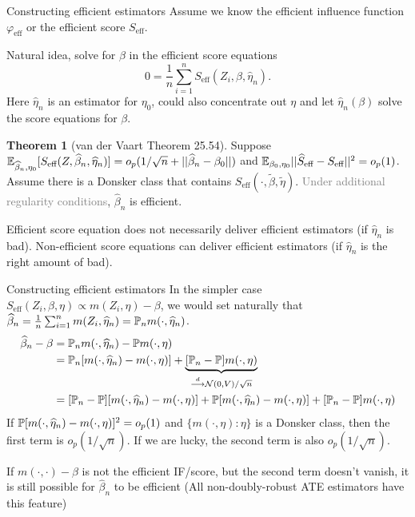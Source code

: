 \documentclass[10pt,aspectratio=169,handout]{beamer}
\theoremstyle{definition}
\newtheorem{thm}{Theorem}
\newcommand{\light}[1]{\textcolor{gray}{#1}}
\begin{document}
\begin{frame}{Constructing efficient estimators}
\small
Assume we know the efficient influence function $\varphi_{\text{eff}}$ or
the efficient score $S_{\text{eff}}$. 

Natural idea, solve for $\beta$ in
the \alert{efficient score equations} \[
0 = \frac{1}{n}\sum_{i=1}^n S_{\text{eff}}(Z_i,
\beta, \hat \eta_n).
\]
Here $\hat \eta_n$ is an estimator for $\eta_0$, could also concentrate out
$\eta$ and let $\hat \eta_n(\beta)$ solve the score equations for $\beta$. 
\begin{thm}[van der Vaart Theorem 25.54]
  Suppose $\E_{\hat\beta_n,\eta_0}[S_\text{eff}(Z, \hat\beta_n,
  \hat\eta_n)] = o_p(1/\sqrt{n} + ||\hat \beta_n - \beta_0||)$ and $\E_
  {\beta_0, \eta_0}||\hat S_\text{eff} - S_\text{eff}||^2 = o_p(1)$. Assume
there is a Donsker class that contains $S_{\text{eff}}(\cdot,
\tilde \beta, \tilde \eta)$. \light{Under additional regularity
conditions},
  $\hat\beta_n$ is efficient.
\end{thm}

\begin{rmk}
  Efficient score equation does not necessarily deliver efficient
  estimators (if $\hat\eta_n$ is bad). Non-efficient score equations can
  deliver efficient
  estimators (if $\hat \eta_n$ is the right amount of bad).
\end{rmk}

  
\end{frame}

\begin{frame}{Constructing efficient estimators}
In the simpler case $S_\text{eff}(Z_i, \beta,\eta) \propto m(Z_i, \eta) -
\beta$,
we would set naturally that $\hat\beta_n = \frac{1}{n}\sum_{i=1}^n m(Z_i,
\hat\eta_n) = \P_n m(\cdot, \hat \eta_n)$.
\begin{align*}
\hat\beta_n - \beta &= \P_n m(\cdot, \hat\eta_n) - \P m(\cdot, \eta) \\ 
&= \P_n[m(\cdot, \hat\eta_n) - m(\cdot, \eta)] + \underbrace{[\P_n - \P]m
(\cdot, \eta)}_{\dto \Norm(0, V) / \sqrt{n}} \\ 
&= [\P_n - \P][m(\cdot, \hat\eta_n) - m(\cdot, \eta)] + \P[m(\cdot,
\hat\eta_n) - m(\cdot, \eta)] + [\P_n - \P]m
(\cdot, \eta)
\end{align*}
If $\P[m(\cdot,\hat \eta_n) - m(\cdot,\eta)]^2 = o_p(1)$ and $\{m(\cdot,
\eta) : \eta\}$ is a Donsker class, then the first term is $o_p(1/
\sqrt{n})$. If we are lucky, the second term is also $o_p(1/\sqrt{n})$. 

If $m
(\cdot,\cdot)-\beta$ is
not the efficient IF/score, but the second term  doesn't vanish, it is
still
possible for $\hat\beta_n$ to be efficient (All non-doubly-robust ATE
estimators have this feature)
  
\end{frame}
\end{document}
